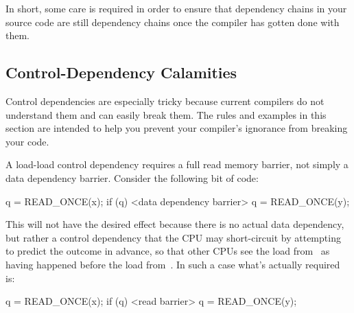 \QuickQuizEnd

In short, some care is required in order to ensure that dependency
chains in your source code are still dependency chains once the
compiler has gotten done with them.

\subsection{Control-Dependency Calamities}
\label{sec:memorder:Control-Dependency Calamities}

Control dependencies are especially tricky because current compilers
do not understand them and can easily break them.
The rules and examples in this section are intended to help you
prevent your compiler's ignorance from breaking your code.

A load-load control dependency requires a full read memory barrier,
not simply a data dependency barrier.
Consider the following bit of code:

\begin{VerbatimN}
q = READ_ONCE(x);
if (q) {
	<data dependency barrier>
	q = READ_ONCE(y);
}
\end{VerbatimN}

This will not have the desired effect because there is no actual data
dependency, but rather a control dependency that the CPU may short-circuit
by attempting to predict the outcome in advance, so that other CPUs see
the load from~ as having happened before the load from~.
In such a case what's actually required is:

\begin{VerbatimN}
q = READ_ONCE(x);
if (q) {
	<read barrier>
	q = READ_ONCE(y);
}
\end{VerbatimN}

